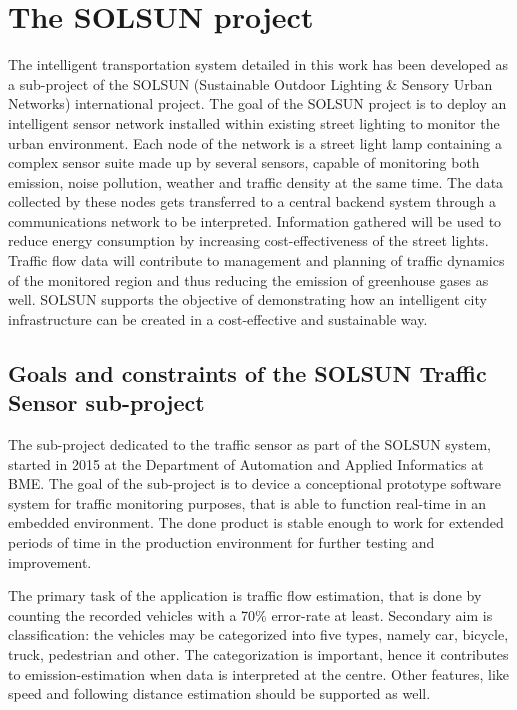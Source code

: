 \section{The SOLSUN project}
The intelligent transportation system detailed in this work has been developed as a sub-project of the SOLSUN (Sustainable Outdoor Lighting \& Sensory Urban Networks) international project\cite{SOLSUN}.
The goal of the SOLSUN project is to deploy an intelligent sensor network installed within existing street lighting to monitor the urban environment.
Each node of the network is a street light lamp containing a complex sensor suite made up by several sensors, capable of monitoring both emission, noise pollution, weather and traffic density at the same time.
The data collected by these nodes gets transferred to a central backend system through a communications network to be interpreted.
Information gathered will be used to reduce energy consumption by increasing cost-effectiveness of the street lights.
Traffic flow data will contribute to management and planning of traffic dynamics of the monitored region and thus reducing the emission of greenhouse gases as well.
SOLSUN supports the objective of demonstrating how an intelligent city infrastructure can be created in a cost-effective and sustainable way.

\subsection{Goals and constraints of the SOLSUN Traffic Sensor sub-project}
The sub-project dedicated to the traffic sensor as part of the SOLSUN system, started in 2015 at the Department of Automation and Applied Informatics at BME\cite{SOLSUN_BME}.
The goal of the sub-project is to device a conceptional prototype software system for traffic monitoring purposes, that is able to function real-time in an embedded environment.
The done product is stable enough to work for extended periods of time in the production environment for further testing and improvement.

The primary task of the application is traffic flow estimation, that is done by counting the recorded vehicles with a 70\% error-rate at least.
Secondary aim is classification: the vehicles may be categorized into five types, namely car, bicycle, truck, pedestrian and other.
The categorization is important, hence it contributes to emission-estimation when data is interpreted at the centre\cite{Csorba2016}.
Other features, like speed and following distance estimation should be supported as well.

